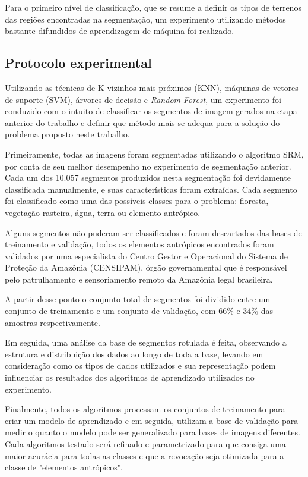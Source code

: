 Para o primeiro nível de classificação, que se resume a definir os tipos de terrenos das regiões encontradas na segmentação, um experimento utilizando métodos bastante difundidos de aprendizagem de máquina foi realizado.

\subsection{Protocolo experimental}

Utilizando as técnicas de K vizinhos mais próximos (KNN), máquinas de vetores de suporte (SVM), árvores de decisão e \textit{Random Forest}, um experimento foi conduzido com o intuito de classificar os segmentos de imagem gerados na etapa anterior do trabalho e definir que método mais se adequa para a solução do problema proposto neste trabalho.

Primeiramente, todas as imagens foram segmentadas utilizando o algoritmo SRM, por conta de seu melhor desempenho no experimento de segmentação anterior. Cada um dos 10.057 segmentos produzidos nesta segmentação foi devidamente classificada manualmente, e suas características foram extraídas. Cada segmento foi classificado como uma das possíveis classes para o problema: floresta, vegetação rasteira, água, terra ou elemento antrópico.

Alguns segmentos não puderam ser classificados e foram descartados das bases de treinamento e validação, todos os elementos antrópicos encontrados foram validados por uma especialista do Centro Gestor e Operacional do Sistema de Proteção da Amazônia (CENSIPAM), órgão governamental que é responsável pelo patrulhamento e sensoriamento remoto da Amazônia legal brasileira.

A partir desse ponto o conjunto total de segmentos foi dividido entre um conjunto de treinamento e um conjunto de validação, com 66\% e 34\% das amostras respectivamente.

Em seguida, uma análise da base de segmentos rotulada é feita, observando a estrutura e distribuição dos dados ao longo de toda a base, levando em consideração como os tipos de dados utilizados e sua representação podem influenciar os resultados dos algoritmos de aprendizado utilizados no experimento.

Finalmente, todos os algoritmos processam os conjuntos de treinamento para criar um modelo de aprendizado e em seguida, utilizam a base de validação para medir o quanto o modelo pode ser generalizado para bases de imagens diferentes. Cada algoritmos testado será refinado e parametrizado para que consiga uma maior acurácia para todas as classes e que a revocação seja otimizada para a classe de "elementos antrópicos".

